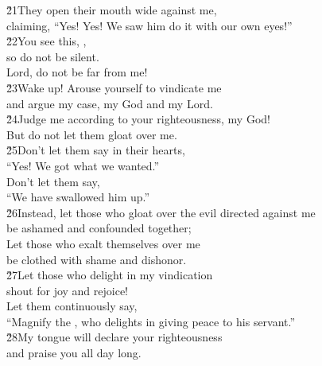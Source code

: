 \begin{poetry}
\poeml \v{21}They open their mouth wide against me, \\
\poemll    claiming, ``Yes! Yes! We saw him do it with our own eyes!'' \\
\poeml \v{22}You see this, , \\
\poemll    so do not be silent. \\
\poemlll       Lord, do not be far from me! \\
\poeml \v{23}Wake up! Arouse yourself to vindicate me \\
\poemll    and argue my case, my God and my Lord. \\
\poeml \v{24}Judge me according to your righteousness,  my God! \\
\poemll    But do not let them gloat over me. \\
\poeml \v{25}Don't let them say in their hearts, \\
\poemll    ``Yes! We got what we wanted.'' \\
\poeml Don't let them say, \\
\poemll    ``We have swallowed him up.'' \\
\poeml \v{26}Instead, let those who gloat over the evil directed against me \\
\poemll    be ashamed and confounded together; \\
\poeml Let those who exalt themselves over me \\
\poemll    be clothed with shame and dishonor. \\
\poeml \v{27}Let those who delight in my vindication \\
\poemll    shout for joy and rejoice! \\
\poeml Let them continuously say, \\
\poemll    ``Magnify the , who delights in giving peace to his servant.'' \\
\poeml \v{28}My tongue will declare your righteousness \\
\poemll    and praise you all day long.
\end{poetry}

